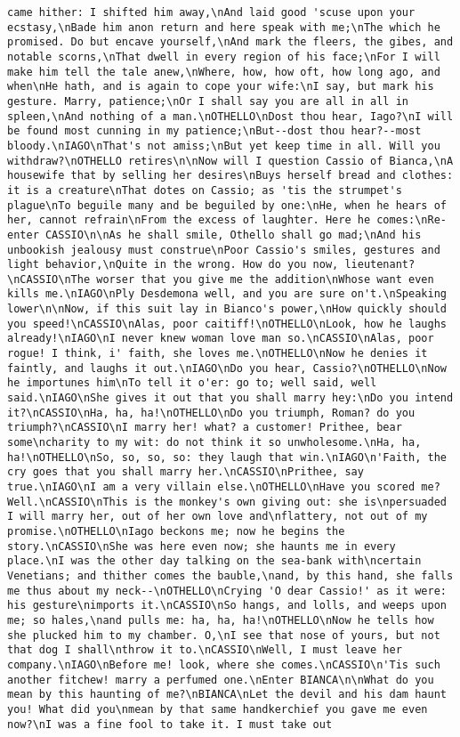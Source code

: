 \begin{verbatim}
came hither: I shifted him away,\nAnd laid good 'scuse upon your ecstasy,\nBade him anon return and here speak with me;\nThe which he promised. Do but encave yourself,\nAnd mark the fleers, the gibes, and notable scorns,\nThat dwell in every region of his face;\nFor I will make him tell the tale anew,\nWhere, how, how oft, how long ago, and when\nHe hath, and is again to cope your wife:\nI say, but mark his gesture. Marry, patience;\nOr I shall say you are all in all in spleen,\nAnd nothing of a man.\nOTHELLO\nDost thou hear, Iago?\nI will be found most cunning in my patience;\nBut--dost thou hear?--most bloody.\nIAGO\nThat's not amiss;\nBut yet keep time in all. Will you withdraw?\nOTHELLO retires\n\nNow will I question Cassio of Bianca,\nA housewife that by selling her desires\nBuys herself bread and clothes: it is a creature\nThat dotes on Cassio; as 'tis the strumpet's plague\nTo beguile many and be beguiled by one:\nHe, when he hears of her, cannot refrain\nFrom the excess of laughter. Here he comes:\nRe-enter CASSIO\n\nAs he shall smile, Othello shall go mad;\nAnd his unbookish jealousy must construe\nPoor Cassio's smiles, gestures and light behavior,\nQuite in the wrong. How do you now, lieutenant?\nCASSIO\nThe worser that you give me the addition\nWhose want even kills me.\nIAGO\nPly Desdemona well, and you are sure on't.\nSpeaking lower\n\nNow, if this suit lay in Bianco's power,\nHow quickly should you speed!\nCASSIO\nAlas, poor caitiff!\nOTHELLO\nLook, how he laughs already!\nIAGO\nI never knew woman love man so.\nCASSIO\nAlas, poor rogue! I think, i' faith, she loves me.\nOTHELLO\nNow he denies it faintly, and laughs it out.\nIAGO\nDo you hear, Cassio?\nOTHELLO\nNow he importunes him\nTo tell it o'er: go to; well said, well said.\nIAGO\nShe gives it out that you shall marry hey:\nDo you intend it?\nCASSIO\nHa, ha, ha!\nOTHELLO\nDo you triumph, Roman? do you triumph?\nCASSIO\nI marry her! what? a customer! Prithee, bear some\ncharity to my wit: do not think it so unwholesome.\nHa, ha, ha!\nOTHELLO\nSo, so, so, so: they laugh that win.\nIAGO\n'Faith, the cry goes that you shall marry her.\nCASSIO\nPrithee, say true.\nIAGO\nI am a very villain else.\nOTHELLO\nHave you scored me? Well.\nCASSIO\nThis is the monkey's own giving out: she is\npersuaded I will marry her, out of her own love and\nflattery, not out of my promise.\nOTHELLO\nIago beckons me; now he begins the story.\nCASSIO\nShe was here even now; she haunts me in every place.\nI was the other day talking on the sea-bank with\ncertain Venetians; and thither comes the bauble,\nand, by this hand, she falls me thus about my neck--\nOTHELLO\nCrying 'O dear Cassio!' as it were: his gesture\nimports it.\nCASSIO\nSo hangs, and lolls, and weeps upon me; so hales,\nand pulls me: ha, ha, ha!\nOTHELLO\nNow he tells how she plucked him to my chamber. O,\nI see that nose of yours, but not that dog I shall\nthrow it to.\nCASSIO\nWell, I must leave her company.\nIAGO\nBefore me! look, where she comes.\nCASSIO\n'Tis such another fitchew! marry a perfumed one.\nEnter BIANCA\n\nWhat do you mean by this haunting of me?\nBIANCA\nLet the devil and his dam haunt you! What did you\nmean by that same handkerchief you gave me even now?\nI was a fine fool to take it. I must take out 
\end{verbatim}
